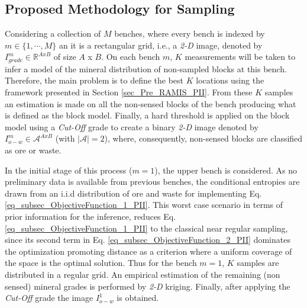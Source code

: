 \subsection{Proposed Methodology for Sampling}
Considering a collection of $M$
benches, where every bench is indexed by $m\in \lbrace 1,\cdots,M\rbrace$ an it is a rectangular grid, i.e., a \emph{2-D} image, denoted by $I_{grade} ^{m} \in \mathbb{R}^{A x B}$ of size $A$ x $B$. 
On each bench $m$, $K$ measurements will be taken to infer a model of the mineral distribution of non-sampled blocks at this bench. Therefore, the main problem is to define the best $K$ locations %
using the framework presented in Section \ref{sec_Pre_RAMIS_PII}.
From these $K$ samples an estimation is made on all the non-sensed blocks of the bench producing what is defined as the block model. Finally, a hard threshold is applied on the block model using a \emph{Cut-Off} grade to create a binary \emph{2-D} image denoted by $I_{o-w}^{m} \in \mathcal{A}^{A x B}$ (with $| \mathcal{A} | = 2$), where, consequently, non-sensed blocks are classified as ore or waste.  

In the initial stage of this process ($m = 1$), the upper bench is considered. As no preliminary data is available from previous benches, the conditional entropies are drawn from an i.i.d distribution of ore and waste for implementing Eq. \eqref{eq_subsec_ObjectiveFunction_1_PII}. This worst case scenario in terms of prior information for the inference, reduces Eq. \eqref{eq_subsec_ObjectiveFunction_1_PII} to the classical near regular sampling, since its second term in Eq. \eqref{eq_subsec_ObjectiveFunction_2_PII} dominates the optimization promoting distance as a criterion where a uniform coverage of the space is the optimal solution. Thus for the bench $m = 1$, $K$ samples are distributed in a regular grid. An empirical estimation of the remaining (non sensed) mineral grades is performed by \emph{2-D} kriging. Finally, after applying the \emph{Cut-Off} grade the image $I_{o-w}^{1}$ is obtained.

